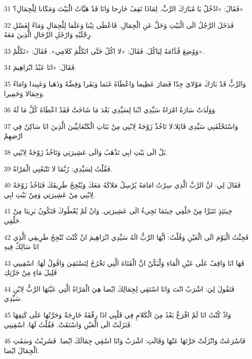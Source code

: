 \par 31 فَقَالَ: «ادْخُلْ يَا مُبَارَكَ الرَّبِّ. لِمَاذَا تَقِفُ خَارِجا وَانَا قَدْ هَيَّاتُ الْبَيْتَ وَمَكَانا لِلْجِمَالِ؟»
\par 32 فَدَخَلَ الرَّجُلُ الَى الْبَيْتِ وَحَلَّ عَنِ الْجِمَالِ. فَاعْطَى تِبْنا وَعَلَفا لِلْجِمَالِ وَمَاءً لِغَسْلِ رِجْلَيْهِ وَارْجُلِ الرِّجَالِ الَّذِينَ مَعَهُ.
\par 33 وَوُضِعَ قُدَّامَهُ لِيَاكُلَ. فَقَالَ: «لا اكُلُ حَتَّى اتَكَلَّمَ كَلامِي». فَقَالَ: «تَكَلَّمْ».
\par 34 فَقَالَ: «انَا عَبْدُ ابْرَاهِيمَ.
\par 35 وَالرَّبُّ قَدْ بَارَكَ مَوْلايَ جِدّا فَصَارَ عَظِيما وَاعْطَاهُ غَنَما وَبَقَرا وَفِضَّةً وَذَهَبا وَعَبِيدا وَامَاءً وَجِمَالا وَحَمِيرا.
\par 36 وَوَلَدَتْ سَارَةُ امْرَاةُ سَيِّدِي ابْنا لِسَيِّدِي بَعْدَ مَا شَاخَتْ فَقَدْ اعْطَاهُ كُلَّ مَا لَهُ.
\par 37 وَاسْتَحْلَفَنِي سَيِّدِي قَائِلا:لا تَاخُذْ زَوْجَةً لِابْنِي مِنْ بَنَاتِ الْكَنْعَانِيِّينَ الَّذِينَ انَا سَاكِنٌ فِي ارْضِهِمْ
\par 38 بَلْ الَى بَيْتِ ابِي تَذْهَبُ وَالَى عَشِيرَتِي وَتَاخُذُ زَوْجَةً لِابْنِي.
\par 39 فَقُلْتُ لِسَيِّدِي: رُبَّمَا لا تَتْبَعُنِي الْمَرْاةُ.
\par 40 فَقَالَ لِي: انَّ الرَّبَّ الَّذِي سِرْتُ امَامَهُ يُرْسِلُ مَلاكَهُ مَعَكَ وَيُنْجِحُ طَرِيقَكَ فَتَاخُذُ زَوْجَةً لِابْنِي مِنْ عَشِيرَتِي وَمِنْ بَيْتِ ابِي.
\par 41 حِينَئِذٍ تَتَبَرَّا مِنْ حَلْفِي حِينَمَا تَجِيءُ الَى عَشِيرَتِي. وَانْ لَمْ يُعْطُوكَ فَتَكُونُ بَرِيئا مِنْ حَلْفِي.
\par 42 فَجِئْتُ الْيَوْمَ الَى الْعَيْنِ وَقُلْتُ: ايُّهَا الرَّبُّ الَهُ سَيِّدِي ابْرَاهِيمَ انْ كُنْتَ تُنْجِحُ طَرِيقِي الَّذِي انَا سَالِكٌ فِيهِ
\par 43 فَهَا انَا وَاقِفٌ عَلَى عَيْنِ الْمَاءِ وَلْيَكُنْ انَّ الْفَتَاةَ الَّتِي تَخْرُجُ لِتَسْتَقِيَ وَاقُولُ لَهَا: اسْقِينِي قَلِيلَ مَاءٍ مِنْ جَرَّتِكِ
\par 44 فَتَقُولَ لِيَ: اشْرَبْ انْتَ وَانَا اسْتَقِي لِجِمَالِكَ ايْضا هِيَ الْمَرْاةُ الَّتِي عَيَّنَهَا الرَّبُّ لِابْنِ سَيِّدِي.
\par 45 وَاذْ كُنْتُ انَا لَمْ افْرَغْ بَعْدُ مِنَ الْكَلامِ فِي قَلْبِي اذَا رِفْقَةُ خَارِجَةٌ وَجَرَّتُهَا عَلَى كَتِفِهَا فَنَزَلَتْ الَى الْعَيْنِ وَاسْتَقَتْ. فَقُلْتُ لَهَا: اسْقِينِي.
\par 46 فَاسْرَعَتْ وَانْزَلَتْ جَرَّتَهَا عَنْهَا وَقَالَتِ: اشْرَبْ وَانَا اسْقِي جِمَالَكَ ايْضا. فَشَرِبْتُ وَسَقَتِ الْجِمَالَ ايْضا.
